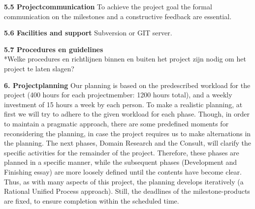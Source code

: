 \documentclass{article}
\begin{document}
\noindent
\textbf{5.5 Projectcommunication}
\newline
To achieve the project goal the formal communication on the milestones and a constructive feedback are essential.
\newline

\noindent
\textbf{5.6 Facilities and support}
\newline
Subversion or GIT server.
\newline

\noindent
\textbf{5.7 Procedures en guidelines}
\\*Welke procedures en richtlijnen binnen en buiten het project zijn nodig om het project te laten slagen?
\newline

\textbf{6. Projectplanning}
\newline
Our planning is based on the predescribed workload for the project (400 hours for each projectmember: 1200 hours total), and a weekly investment of 15 hours a week by each person. To make a realistic planning, at first we will try to adhere to the given workload for each phase.  Though, in order to maintain a pragmatic approach, there are some predefined moments for reconsidering the planning, in case the project requires us to make alternations in the planning. The next phases, Domain Research and the Consult, will clarify the specific activities for the remainder of the project. Therefore, these phases are planned in a specific manner, while the subsequent phases (Development and Finishing essay) are more loosely defined until the contents have become clear. Thus, as with many aspects of this project, the planning develops iteratively (a Rational Unified Process approach). Still, the deadlines of the milestone-products are fixed, to ensure completion within the scheduled time.
\end{document}
